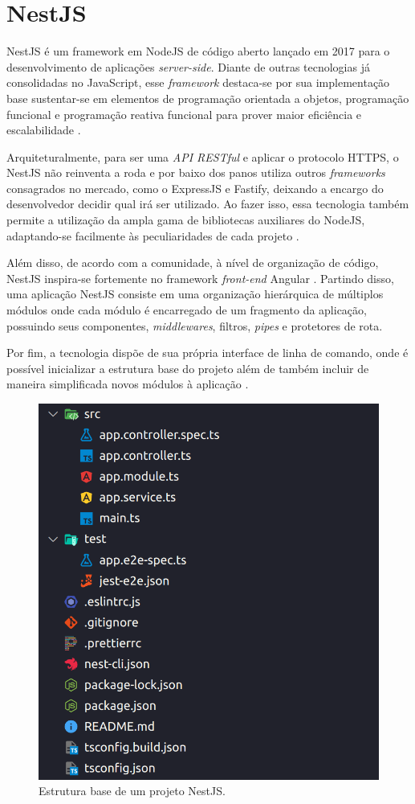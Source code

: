\section{NestJS}
\label{sec:nestjs}
NestJS é um framework em NodeJS de código aberto lançado em 2017 para o desenvolvimento de aplicações \textit{server-side}. Diante de outras tecnologias já consolidadas no JavaScript, esse \textit{framework} destaca-se por sua implementação base sustentar-se em elementos de programação orientada a objetos, programação funcional e programação reativa funcional para prover maior eficiência e escalabilidade \cite{Mysliwiec2023b}.

Arquiteturalmente, para ser uma \textit{API RESTful} e aplicar o protocolo HTTPS, o NestJS não reinventa a roda e por baixo dos panos utiliza outros \textit{frameworks} consagrados no mercado, como o ExpressJS e Fastify, deixando a encargo do desenvolvedor decidir qual irá ser utilizado. Ao fazer isso, essa tecnologia também permite a utilização da ampla gama de bibliotecas auxiliares do NodeJS, adaptando-se facilmente às peculiaridades de cada projeto \cite{Mysliwiec2023}.

Além disso, de acordo com a comunidade, à nível de organização de código, NestJS inspira-se fortemente no framework \textit{front-end} Angular \cite{Passos2018}. Partindo disso, uma aplicação NestJS consiste em uma organização hierárquica de múltiplos módulos onde cada módulo é encarregado de um fragmento da aplicação, possuindo seus componentes, \textit{middlewares}, filtros, \textit{pipes} e protetores de rota.

Por fim, a tecnologia dispõe de sua própria interface de linha de comando, onde é possível inicializar a estrutura base do projeto além de também incluir de maneira simplificada novos módulos à aplicação \cite{Mysliwiec2023a}.

\begin{figure}[H]
    \centering
    \caption{Estrutura base de um projeto NestJS.}
    \label{fig:nestjs}
    \includegraphics[width=.4\textwidth]{data/figures/nest.png}
\end{figure}